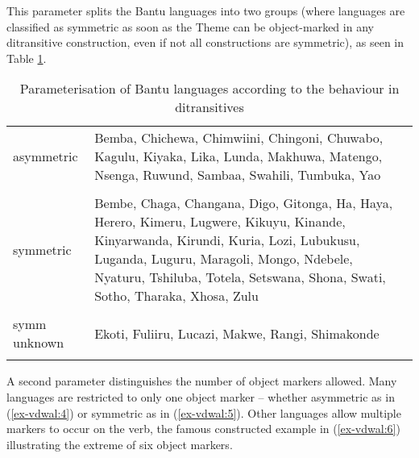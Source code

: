 \documentclass[output=paper
,modfonts
,nonflat]{langsci/langscibook}
\begin{document}
This parameter splits the Bantu languages into two groups (where languages are classified as symmetric as soon as the Theme can be object-marked in any ditransitive construction, even if not all constructions are symmetric), as seen in Table \ref{Table 1}.
\begin{table}
\caption{Parameterisation of Bantu languages according to the behaviour in ditransitives}
\label{Table 1}	
	\begin{tabularx}{\textwidth}{lX}
	\lsptoprule
	asymmetric & Bemba, Chichewa, Chimwiini, Chingoni, Chuwabo, Kagulu, Kiyaka,
	Lika, Lunda, Makhuwa, Matengo, Nsenga, Ruwund, Sambaa, Swahili, Tumbuka, Yao\\ \\
	\midrule
	symmetric & Bembe, Chaga, Changana, Digo, Gitonga, Ha, Haya, Herero, Kimeru, Lugwere, Kikuyu, Kinande, Kinyarwanda, Kirundi, Kuria, Lozi, Lubukusu, Luganda, Luguru, Maragoli, Mongo, Ndebele, Nyaturu, Tshiluba, Totela, Setswana, Shona, Swati, Sotho, Tharaka, Xhosa, Zulu\\ \\
	\midrule
	symm unknown & Ekoti, Fuliiru, Lucazi, Makwe, Rangi, Shimakonde\\
	\lspbottomrule
	\end{tabularx}
\end{table} \newpage \noindent
A second parameter distinguishes the number of object markers allowed. Many languages are restricted to only one object marker – whether asymmetric as in (\ref{ex-vdwal:4}) or symmetric as in (\ref{ex-vdwal:5}). Other languages allow multiple markers to occur on the verb, the famous constructed example in (\ref{ex-vdwal:6}) illustrating the extreme of six object markers.
\end{document}
